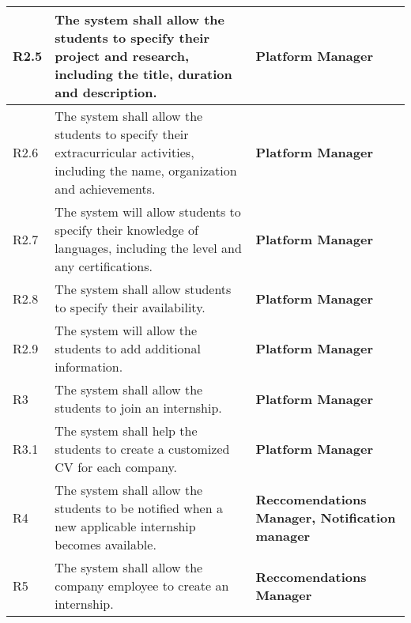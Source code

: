 \begin{center}
\begin{longtable}{|l|p{8cm}|p{5cm}|}
        R2.5  & The system shall allow the students to specify their project and research,
including the title, duration and description.                                                                                                     & \textbf{Platform Manager}                     \\\hline
        R2.6  & The system shall allow the students to specify their extracurricular activities, including the name, organization and achievements.                                                                                                     & \textbf{Platform Manager}                    
        \\\hline
        R2.7  & The system will allow students to specify their knowledge of languages,
including the level and any certifications.                                                                                                     & \textbf{Platform Manager}                 
\\\hline
        R2.8  & The system shall allow students to specify their availability.                                                                                                     & \textbf{Platform Manager}                   \\\hline
        R2.9  & The system will allow the students to add additional information.                                                                                                     & \textbf{Platform Manager}                                                        \\\hline
        R3    & The system shall allow the students to join an internship.                                       & \textbf{Platform Manager}                                             \\\hline
        R3.1    & The system shall help the students to create a customized CV for each company.                                                                                                                 &\textbf{Platform Manager}                                                  \\\hline
        R4    & The system shall allow the students to be notified when a new applicable internship becomes available.                                                                            & \textbf{Reccomendations Manager, Notification manager}                                                  \\\hline
        R5    & The system shall allow the company employee to create an internship.                                                                            & \textbf{Reccomendations Manager}                                                  \\\hline

\end{longtable}
\end{center}
